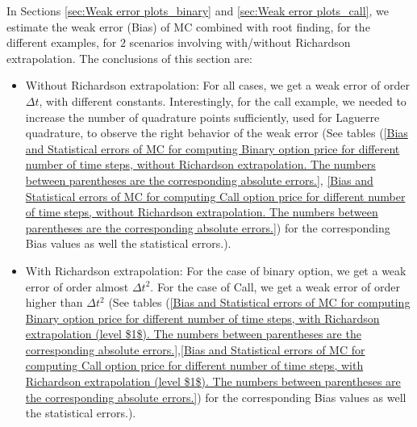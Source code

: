 \documentclass[11pt]{article}
\begin{document}
In Sections \ref{sec:Weak error plots_binary} and \ref{sec:Weak error plots_call}, we estimate the weak error  (Bias) of MC combined with root finding, for the different  examples, for $2$ scenarios involving with/without  Richardson extrapolation. The conclusions of this section are: 
\begin{itemize}
	\item Without Richardson extrapolation: For all cases, we get a weak error of order $\Delta t$, with different  constants. Interestingly,  for the call example, we needed to increase the number of quadrature points sufficiently, used for Laguerre quadrature,  to observe the right behavior of the weak error (See tables (\ref{Bias and Statistical errors of MC  for computing Binary option price  for different number of time steps, without Richardson extrapolation. The numbers between parentheses are the corresponding absolute errors.}, \ref{Bias and Statistical errors of MC  for computing Call option price  for different number of time steps, without Richardson extrapolation. The numbers between parentheses are the corresponding absolute errors.}) for the corresponding Bias values as well the statistical errors.). 
	
	\item With Richardson extrapolation: For the case of binary option, we get a weak error of order almost $\Delta t^2$. For the case of Call,   we get a weak error of order higher than $\Delta t^2$  (See tables (\ref{Bias and Statistical errors of MC  for computing Binary option price  for different number of time steps, with Richardson extrapolation (level $1$). The numbers between parentheses are the corresponding absolute errors.},\ref{Bias and Statistical errors of MC  for computing Call option price  for different number of time steps, with Richardson extrapolation (level $1$). The numbers between parentheses are the corresponding absolute errors.}) for the corresponding Bias values as well the statistical errors.).  
\end{itemize}
\end{document}

